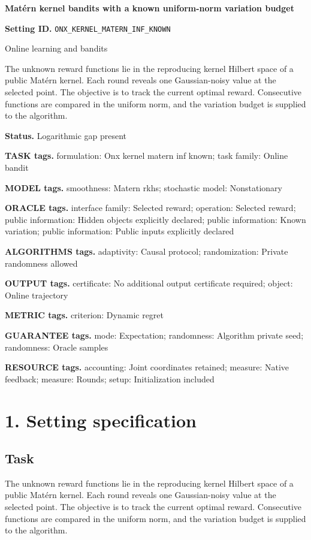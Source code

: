 \documentclass[10pt,a4paper]{article}
\begin{document}
\raggedright

{\LARGE\bfseries\sffamily\color{AtlasNavy} Matérn kernel bandits with a known uniform-norm variation budget\par}\vspace{5pt}
\textbf{Setting ID.} \texttt{ONX\_\allowbreak{}KERNEL\_\allowbreak{}MATERN\_\allowbreak{}INF\_\allowbreak{}KNOWN}

Online learning and bandits

The unknown reward functions lie in the reproducing kernel Hilbert space of a public Matérn kernel. Each round reveals one Gaussian-noisy value at the selected point. The objective is to track the current optimal reward. Consecutive functions are compared in the uniform norm, and the variation budget is supplied to the algorithm.

\textbf{Status.} Logarithmic gap present

\textbf{TASK tags.} formulation: Onx kernel matern inf known; task family: Online bandit

\textbf{MODEL tags.} smoothness: Matern rkhs; stochastic model: Nonstationary

\textbf{ORACLE tags.} interface family: Selected reward; operation: Selected reward; public information: Hidden objects explicitly declared; public information: Known variation; public information: Public inputs explicitly declared

\textbf{ALGORITHMS tags.} adaptivity: Causal protocol; randomization: Private randomness allowed

\textbf{OUTPUT tags.} certificate: No additional output certificate required; object: Online trajectory

\textbf{METRIC tags.} criterion: Dynamic regret

\textbf{GUARANTEE tags.} mode: Expectation; randomness: Algorithm private seed; randomness: Oracle samples

\textbf{RESOURCE tags.} accounting: Joint coordinates retained; measure: Native feedback; measure: Rounds; setup: Initialization included

\section{1. Setting specification}
\subsection{Task}
The unknown reward functions lie in the reproducing kernel Hilbert space of a public Matérn kernel. Each round reveals one Gaussian-noisy value at the selected point. The objective is to track the current optimal reward. Consecutive functions are compared in the uniform norm, and the variation budget is supplied to the algorithm.
\end{document}
